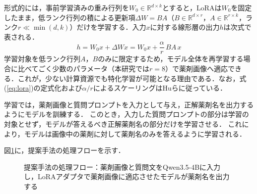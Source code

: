 \documentclass[dvipdfmx]{jsarticle}
\begin{document}
形式的には，事前学習済みの重み行列を$W_0 \in \mathbb{R}^{d \times k}$とすると，LoRAは$W_0$を固定したまま，低ランク行列の積による更新項$\Delta W = BA$（$B \in \mathbb{R}^{d \times r}$，$A \in \mathbb{R}^{r \times k}$，ランク$r \ll \min(d,k)$）だけを学習する\cite{hu2022lora}．入力$x$に対する線形層の出力$h$は次式で表される．
\begin{equation}
h = W_0 x + \Delta W x = W_0 x + \frac{\alpha}{r}\,B A\,x
\label{eq:lora}
\end{equation}
学習対象を低ランク行列$A$，$B$のみに限定するため，モデル全体を再学習する場合に比べてごく少数のパラメータ（本研究では$r=8$）で薬剤画像へ適応できる．これが，少ない計算資源でも特化学習が可能となる理由である．なお，式(\ref{eq:lora})の定式化および$\alpha/r$によるスケーリングはHuら\cite{hu2022lora}に従っている．

学習では，薬剤画像と質問プロンプトを入力として与え，正解薬剤名を出力するようにモデルを訓練する．
このとき，入力した質問プロンプトの部分は学習の対象とせず，モデルが答えるべき正解薬剤名の部分だけを学習させる．
これにより，モデルは画像中の薬剤に対して薬剤名のみを答えるように学習される．

図\ref{fig:pipeline}に，提案手法の処理フローを示す．

\begin{figure}[h]
\centering
{}
\caption{提案手法の処理フロー：薬剤画像と質問文をQwen3.5-4Bに入力し，LoRAアダプタで薬剤画像に適応させたモデルが薬剤名を出力する}
\label{fig:pipeline}
\end{figure}
\end{document}
